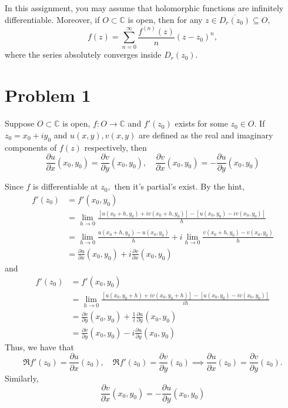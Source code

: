 \documentclass[11pt]{article}
\newcommand{\bbC}{\mathbb{C}}
\begin{document}
	
	
	\psetheader
In this assignment, you may assume that holomorphic functions are infinitely differentiable. Moreover, if $O \subset \bbC$ is open, then for any $z\in \overline{D_r(z_0)}\subseteq O,$ 
\[f(z) = \sum_{n=0}^\infty \frac{f^{(n)}(z)}{n}(z - z_0)^n,\] where the series absolutely converges inside $D_r(z_0).$ 
\section*{Problem 1}
\begin{problem}
    Suppose $O\subset \bbC$ is open, $f: O \to \bbC$ and $f'(z_0)$ exists for some $z_0 \in O.$ If $z_0 = x_0 + iy_0$ and $u(x,y), v(x,y)$ are defined as the real and imaginary components of $f(z)$ respectively, then 
    \[\frac{\partial u}{\partial x}(x_0, y_0) = \frac{\partial v}{\partial y}(x_0, y_0), \quad \frac{\partial v}{\partial x}(x_0, y_0) = -\frac{\partial u}{\partial y}(x_0, y_0)\]
\end{problem}
\begin{solution}
Since $f$ is differentiable at $z_0,$ then it's partial's exist. 
    By the hint,
    \begin{align*}
f'(z_0) &= f'(x_0, y_0)\\
&= \lim_{h\to 0}\frac{[u(x_0 + h, y_0) + iv(x_0 + h, y_0)] - [u(x_0, y_0) - iv(x_0, y_0)]}{h}\\
&= \lim_{h\to 0}\frac{u(x_0 + h, y_0) - u(x_0, y_0)}{h} + i\lim_{h\to 0}\frac{v(x_0 + h, y_0) - v(x_0, y_0)}{h}\\
&= \frac{\partial u}{\partial x}(x_0, y_0) + i \frac{\partial v}{\partial x}(x_0, y_0)
    \end{align*}
and 
\begin{align*}
    f'(z_0) &= f'(x_0, y_0)\\
    &= \lim_{h\to 0}\frac{[u(x_0, y_0 + h) + iv(x_0, y_0 + h)] - [u(x_0, y_0) - iv(x_0, y_0)]}{ih}\\
    &= \frac{\partial v}{\partial y}(x_0, y_0)+ \frac{1}{i}\frac{\partial u}{\partial y}(x_0, y_0)\\
    &= \frac{\partial v}{\partial y}(x_0, y_0)- i\frac{\partial u}{\partial y}(x_0, y_0)
\end{align*}
Thus, we have that 
\[\Re{f'(z_0)} = \frac{\partial u}{\partial x}(z_0), \quad \Re{f'(z_0)} = \frac{\partial v}{\partial y}(z_0) \implies \frac{\partial u}{\partial x}(z_0) = \frac{\partial v}{\partial y}(z_0).\] Similarly, 
\[\frac{\partial v}{\partial x}(x_0, y_0)= -\frac{\partial u}{\partial y}(x_0, y_0)\]
\end{solution}
\end{document}
